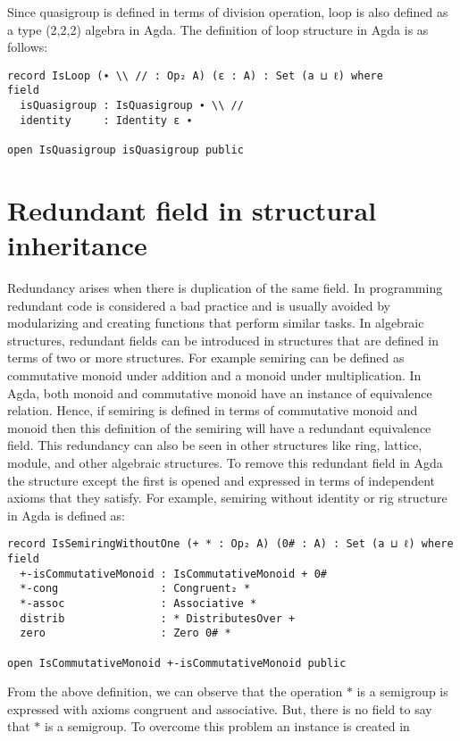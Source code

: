 Since quasigroup is defined in terms of division operation, loop is also defined
as a type (2,2,2) algebra in Agda. The definition of loop structure in Agda is
as follows:

\begin{verbatim}
record IsLoop (∙ \\ // : Op₂ A) (ε : A) : Set (a ⊔ ℓ) where
field
  isQuasigroup : IsQuasigroup ∙ \\ //
  identity     : Identity ε ∙

open IsQuasigroup isQuasigroup public
\end{verbatim}

\section{Redundant field in structural inheritance}
Redundancy arises when there is duplication of the same field. In programming
redundant code is considered a bad practice and is usually avoided by
modularizing and creating functions that perform similar tasks. In algebraic
structures, redundant fields can be introduced in structures that are defined in
terms of two or more structures. For example semiring can be defined as
commutative monoid under addition and a monoid under multiplication. In Agda,
both monoid and commutative monoid have an instance of equivalence relation.
Hence, if semiring is defined in terms of commutative monoid and monoid then
this definition of the semiring will have a redundant equivalence field. This
redundancy can also be seen in other structures like ring, lattice, module, and
other algebraic structures. To remove this redundant field in Agda the structure
except the first is opened and expressed in terms of independent axioms that
they satisfy. For example, semiring without identity or rig structure in Agda is
defined as:
\begin{verbatim}
record IsSemiringWithoutOne (+ * : Op₂ A) (0# : A) : Set (a ⊔ ℓ) where
field
  +-isCommutativeMonoid : IsCommutativeMonoid + 0#
  *-cong                : Congruent₂ *
  *-assoc               : Associative *
  distrib               : * DistributesOver +
  zero                  : Zero 0# *

open IsCommutativeMonoid +-isCommutativeMonoid public
\end{verbatim}
From the above definition, we can observe that the operation $*$ is a semigroup
is expressed with axioms congruent and associative. But, there is no field to
say that $*$ is a semigroup. To overcome this problem an instance is created in
